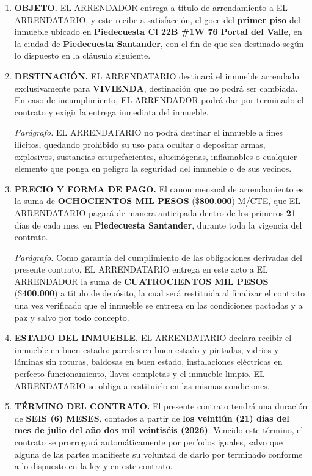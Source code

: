 \documentclass[12pt,letterpaper]{article}
\begin{document}
\begin{enumerate}[label=\textbf{CLÁUSULA \Roman*.}, wide, labelindent=0pt, itemsep=0.4cm]

\item \textbf{OBJETO.} EL ARRENDADOR entrega a título de arrendamiento a EL ARRENDATARIO, y este recibe a satisfacción, el goce del \textbf{primer piso} del inmueble ubicado en \textbf{Piedecuesta Cl 22B \#1W 76 Portal del Valle}, en la ciudad de \textbf{Piedecuesta Santander}, con el fin de que sea destinado según lo dispuesto en la cláusula siguiente.

\item \textbf{DESTINACIÓN.} EL ARRENDATARIO destinará el inmueble arrendado exclusivamente para \textbf{VIVIENDA}, destinación que no podrá ser cambiada. En caso de incumplimiento, EL ARRENDADOR podrá dar por terminado el contrato y exigir la entrega inmediata del inmueble.

\textit{Parágrafo.} EL ARRENDATARIO no podrá destinar el inmueble a fines ilícitos, quedando prohibido su uso para ocultar o depositar armas, explosivos, sustancias estupefacientes, alucinógenas, inflamables o cualquier elemento que ponga en peligro la seguridad del inmueble o de sus vecinos.

\item \textbf{PRECIO Y FORMA DE PAGO.} El canon mensual de arrendamiento es la suma de \textbf{OCHOCIENTOS MIL PESOS} (\$\textbf{800.000}) M/CTE, que EL ARRENDATARIO pagará de manera anticipada dentro de los primeros \textbf{21} días de cada mes, en \textbf{Piedecuesta Santander}, durante toda la vigencia del contrato.

\textit{Parágrafo.} Como garantía del cumplimiento de las obligaciones derivadas del presente contrato, EL ARRENDATARIO entrega en este acto a EL ARRENDADOR la suma de \textbf{CUATROCIENTOS MIL PESOS} (\$\textbf{400.000}) a título de depósito, la cual será restituida al finalizar el contrato una vez verificado que el inmueble se entrega en las condiciones pactadas y a paz y salvo por todo concepto.

\item \textbf{ESTADO DEL INMUEBLE.} EL ARRENDATARIO declara recibir el inmueble en buen estado: paredes en buen estado y pintadas, vidrios y láminas sin roturas, baldosas en buen estado, instalaciones eléctricas en perfecto funcionamiento, llaves completas y el inmueble limpio. EL ARRENDATARIO se obliga a restituirlo en las mismas condiciones.

\item \textbf{TÉRMINO DEL CONTRATO.} El presente contrato tendrá una duración de \textbf{SEIS (6) MESES}, contados a partir de \textbf{los veintiún (21) días del mes de julio del año dos mil veintiséis (2026)}. Vencido este término, el contrato se prorrogará automáticamente por períodos iguales, salvo que alguna de las partes manifieste su voluntad de darlo por terminado conforme a lo dispuesto en la ley y en este contrato.



\end{enumerate}
\end{document}
